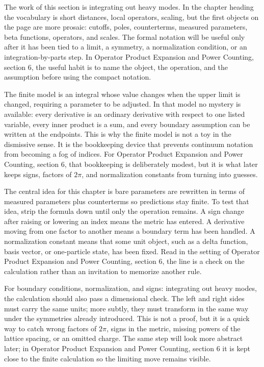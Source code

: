 The work of this section is integrating out heavy modes.  In the chapter heading the vocabulary is short distances, local operators, scaling, but the first objects on the page are more prosaic: cutoffs, poles, counterterms, measured parameters, beta functions, operators, and scales.  The formal notation will be useful only after it has been tied to a limit, a symmetry, a normalization condition, or an integration-by-parts step.  In Operator Product Expansion and Power Counting, section 6, the useful habit is to name the object, the operation, and the assumption before using the compact notation.

The finite model is an integral whose value changes when the upper limit is changed, requiring a parameter to be adjusted.  In that model no mystery is available: every derivative is an ordinary derivative with respect to one listed variable, every inner product is a sum, and every boundary assumption can be written at the endpoints.  This is why the finite model is not a toy in the dismissive sense.  It is the bookkeeping device that prevents continuum notation from becoming a fog of indices.  For Operator Product Expansion and Power Counting, section 6, that bookkeeping is deliberately modest, but it is what later keeps signs, factors of \(2\pi\), and normalization constants from turning into guesses.

The central idea for this chapter is bare parameters are rewritten in terms of measured parameters plus counterterms so predictions stay finite.  To test that idea, strip the formula down until only the operation remains.  A sign change after raising or lowering an index means the metric has entered.  A derivative moving from one factor to another means a boundary term has been handled.  A normalization constant means that some unit object, such as a delta function, basis vector, or one-particle state, has been fixed.  Read in the setting of Operator Product Expansion and Power Counting, section 6, the line is a check on the calculation rather than an invitation to memorize another rule.

For boundary conditions, normalization, and signs: integrating out heavy modes, the calculation should also pass a dimensional check.  The left and right sides must carry the same units; more subtly, they must transform in the same way under the symmetries already introduced.  This is not a proof, but it is a quick way to catch wrong factors of \(2\pi\), signs in the metric, missing powers of the lattice spacing, or an omitted charge.  The same step will look more abstract later; in Operator Product Expansion and Power Counting, section 6 it is kept close to the finite calculation so the limiting move remains visible.

